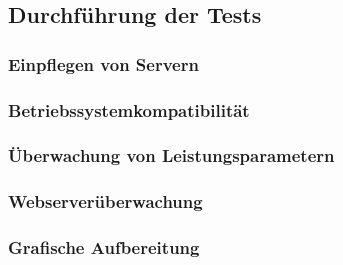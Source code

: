 \subsection{Durchführung der Tests}
\label{sec:DurchführungTests}

\subsubsection{Einpflegen von Servern}
\label{sec:EinpflegenServer}

\subsubsection{Betriebssystemkompatibilität}
\label{sec:EinpflegenServer}

\subsubsection{Überwachung von Leistungsparametern}
\label{sec:ÜberwachungLeistungsparameter}

\subsubsection{Webserverüberwachung}
\label{sec:ÜberwachungWebserver}

\subsubsection{Grafische Aufbereitung}
\label{sec:GrafischeAufbereitung}